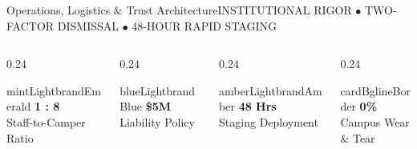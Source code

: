 \documentclass[aspectratio=169,9pt]{beamer}
\begin{document}
\begin{frame}{Operations, Logistics \& Trust Architecture}{INSTITUTIONAL RIGOR $\bullet$ TWO-FACTOR DISMISSAL $\bullet$ 48-HOUR RAPID STAGING}
\vskip4pt
\begin{columns}[T]
  \begin{column}{0.24\textwidth}
    \begin{execbox}{mintLight}{brandEmerald}
      \centering
      \textcolor{brandEmerald}{\textbf{\normalsize 1 : 8}} \\[1pt]
      \tiny Staff-to-Camper Ratio
    \end{execbox}
  \end{column}
  \begin{column}{0.24\textwidth}
    \begin{execbox}{blueLight}{brandBlue}
      \centering
      \textcolor{brandBlue}{\textbf{\normalsize \$5M}} \\[1pt]
      \tiny Liability Policy
    \end{execbox}
  \end{column}
  \begin{column}{0.24\textwidth}
    \begin{execbox}{amberLight}{brandAmber}
      \centering
      \textcolor{brandAmber}{\textbf{\normalsize 48 Hrs}} \\[1pt]
      \tiny Staging Deployment
    \end{execbox}
  \end{column}
  \begin{column}{0.24\textwidth}
    \begin{execbox}{cardBg}{lineBorder}
      \centering
      \textcolor{brandNavy}{\textbf{\normalsize 0\%}} \\[1pt]
      \tiny Campus Wear \& Tear
    \end{execbox}
  \end{column}
\end{columns}

\end{frame}
\end{document}
